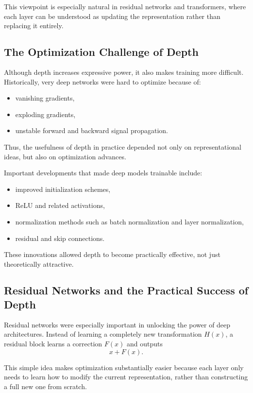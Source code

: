 This viewpoint is especially natural in residual networks and transformers, where each layer can be understood as updating the representation rather than replacing it entirely.

\subsection{The Optimization Challenge of Depth}

Although depth increases expressive power, it also makes training more difficult. Historically, very deep networks were hard to optimize because of:
\begin{itemize}
    \item vanishing gradients,
    \item exploding gradients,
    \item unstable forward and backward signal propagation.
\end{itemize}

Thus, the usefulness of depth in practice depended not only on representational ideas, but also on optimization advances.

Important developments that made deep models trainable include:
\begin{itemize}
    \item improved initialization schemes,
    \item ReLU and related activations,
    \item normalization methods such as batch normalization and layer normalization,
    \item residual and skip connections.
\end{itemize}

These innovations allowed depth to become practically effective, not just theoretically attractive.

\subsection{Residual Networks and the Practical Success of Depth}

Residual networks were especially important in unlocking the power of deep architectures. Instead of learning a completely new transformation \(H(x)\), a residual block learns a correction \(F(x)\) and outputs
\[
x + F(x).
\]

This simple idea makes optimization substantially easier because each layer only needs to learn how to modify the current representation, rather than constructing a full new one from scratch.

